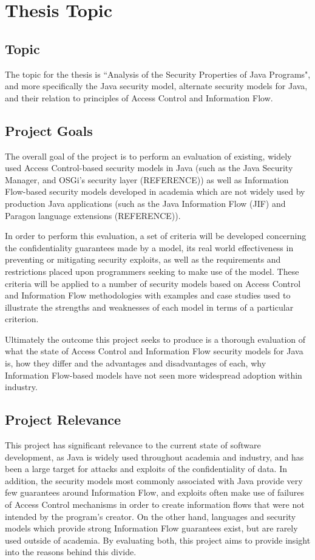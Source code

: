 \section{Thesis Topic}

\subsection{Topic}

The topic for the thesis is ``Analysis of the Security Properties of Java Programs", and more specifically the Java security model, alternate security models for Java, and their relation to principles of Access Control and Information Flow. 

\subsection{Project Goals}

The overall goal of the project is to perform an evaluation of existing, widely used Access Control-based security models in Java (such as the Java Security Manager, and OSGi's security layer (REFERENCE)) as well as Information Flow-based security models developed in academia which are not widely used by production Java applications (such as the Java Information Flow (JIF) and Paragon language extensions (REFERENCE)).

In order to perform this evaluation, a set of criteria will be developed concerning the confidentiality guarantees made by a model, its real world effectiveness in preventing or mitigating security exploits, as well as the requirements and restrictions placed upon programmers seeking to make use of the model. These criteria will be applied to a number of security models based on Access Control and Information Flow methodologies with examples and case studies used to illustrate the strengths and weaknesses of each model in terms of a particular criterion.

Ultimately the outcome this project seeks to produce is a thorough evaluation of what the state of Access Control and Information Flow security models for Java is, how they differ and the advantages and disadvantages of each, why Information Flow-based models have not seen more widespread adoption within industry.

\subsection{Project Relevance}

This project has significant relevance to the current state of software development, as Java is widely used throughout academia and industry, and has been a large target for attacks and exploits of the confidentiality of data. In addition, the security models most commonly associated with Java provide very few guarantees around Information Flow, and exploits often make use of failures of Access Control mechanisms in order to create information flows that were not intended by the program's creator. On the other hand, languages and security models which provide strong Information Flow guarantees exist, but are rarely used outside of academia. By evaluating both, this project aims to provide insight into the reasons behind this divide.